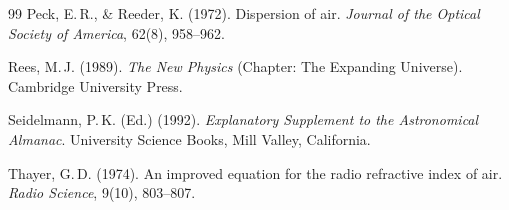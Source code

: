\documentclass[12pt,a4paper]{article}
\begin{document}
\begin{thebibliography}{99}
Peck, E.\,R., \& Reeder, K. (1972).
\newblock Dispersion of air.
\newblock \textit{Journal of the Optical Society of America}, 62(8), 958--962.
\newblock {}

Rees, M.\,J. (1989).
\newblock \textit{The New Physics} (Chapter: The Expanding Universe).
\newblock Cambridge University Press.

Seidelmann, P.\,K. (Ed.) (1992).
\newblock \textit{Explanatory Supplement to the Astronomical Almanac}.
\newblock University Science Books, Mill Valley, California.

Thayer, G.\,D. (1974).
\newblock An improved equation for the radio refractive index of air.
\newblock \textit{Radio Science}, 9(10), 803--807.
\newblock {}

\end{thebibliography}
\end{document}
